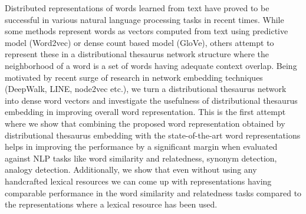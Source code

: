Distributed representations of words learned from text have proved to be successful in various natural language processing tasks in recent times. While some methods represent words as vectors computed from text using predictive model (Word2vec) or dense count based model (GloVe), others attempt to represent these in a distributional thesaurus network structure where the neighborhood of a word is a set of words having adequate context overlap. Being motivated by recent surge of research in network embedding techniques (DeepWalk, LINE, node2vec etc.), we turn a distributional thesaurus network into dense word vectors and investigate the usefulness of distributional thesaurus embedding in improving overall word representation. This is the first attempt where we show that combining the proposed word representation obtained by distributional thesaurus embedding with the state-of-the-art word representations helps in improving the performance by a significant margin when evaluated against NLP tasks like word similarity and relatedness, synonym detection, analogy detection. Additionally, we show that even without using any handcrafted lexical resources we can come up with representations having comparable performance in the word similarity and relatedness tasks compared to the representations where a lexical resource has been used.
